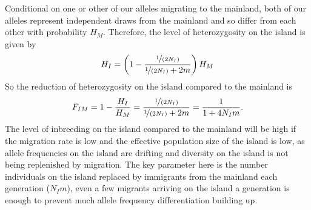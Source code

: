 

Conditional on one or other of our alleles migrating to the mainland, both of our alleles represent independent draws from the mainland and so differ from each other with probability $H_M$. Therefore, the level of
heterozygosity on the island is given by
\begin{equation}
  H_I = \left(1 - \frac{\nicefrac{1}{(2N_I)}}{\nicefrac{1}{(2N_I)} + 2m} \right)H_M
\end{equation}
So the reduction of heterozygosity on the island compared to the
mainland is
\begin{equation}
  F_{IM} = 1- \frac{H_I}{H_M} = \frac{\nicefrac{
      1}{(2N_I)}}{\nicefrac{1}{(2N_I)} + 2m} = \frac{ 1 }{1 + 4N_Im}. \label{eqn:FIM}
\end{equation}
The level of inbreeding on the island compared to the mainland will be
high if the migration rate is low and the effective population size of
the island is low, as allele frequencies on the island are drifting
and diversity on the island is not being replenished by migration. The
key parameter here is the number individuals on the island replaced by
immigrants from the mainland each generation ($N_I m$), even a few
migrants arriving on the island a generation is enough to prevent much
allele frequency differentiation building up.

